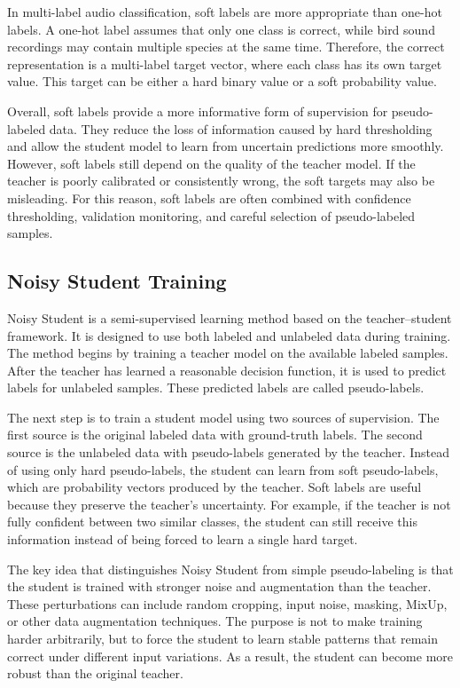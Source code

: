 \documentclass[a4paper,12pt]{article}
\begin{document}
In multi-label audio classification, soft labels are more appropriate than one-hot labels. A one-hot label assumes that only one class is correct, while bird sound recordings may contain multiple species at the same time. Therefore, the correct representation is a multi-label target vector, where each class has its own target value. This target can be either a hard binary value or a soft probability value.

Overall, soft labels provide a more informative form of supervision for pseudo-labeled data. They reduce the loss of information caused by hard thresholding and allow the student model to learn from uncertain predictions more smoothly. However, soft labels still depend on the quality of the teacher model. If the teacher is poorly calibrated or consistently wrong, the soft targets may also be misleading. For this reason, soft labels are often combined with confidence thresholding, validation monitoring, and careful selection of pseudo-labeled samples.


\subsection{Noisy Student Training}

Noisy Student is a semi-supervised learning method based on the teacher--student framework. It is designed to use both labeled and unlabeled data during training. The method begins by training a teacher model on the available labeled samples. After the teacher has learned a reasonable decision function, it is used to predict labels for unlabeled samples. These predicted labels are called pseudo-labels.

The next step is to train a student model using two sources of supervision. The first source is the original labeled data with ground-truth labels. The second source is the unlabeled data with pseudo-labels generated by the teacher. Instead of using only hard pseudo-labels, the student can learn from soft pseudo-labels, which are probability vectors produced by the teacher. Soft labels are useful because they preserve the teacher's uncertainty. For example, if the teacher is not fully confident between two similar classes, the student can still receive this information instead of being forced to learn a single hard target.

The key idea that distinguishes Noisy Student from simple pseudo-labeling is that the student is trained with stronger noise and augmentation than the teacher. These perturbations can include random cropping, input noise, masking, MixUp, or other data augmentation techniques. The purpose is not to make training harder arbitrarily, but to force the student to learn stable patterns that remain correct under different input variations. As a result, the student can become more robust than the original teacher.
\end{document}
